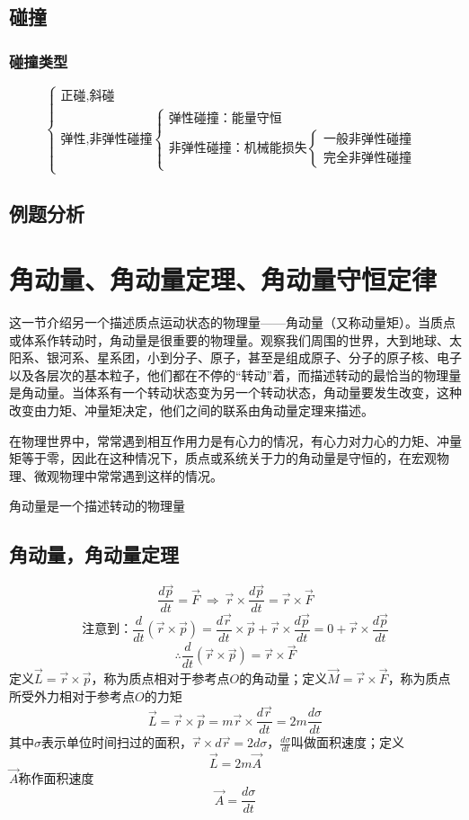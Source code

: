\subsection{碰撞}
\subsubsection{碰撞类型}
\[\begin{cases}\text{正碰,斜碰}\\
\text{弹性,非弹性碰撞}\begin{cases}\text{弹性碰撞：能量守恒}\\\text{非弹性碰撞：机械能损失}\begin{cases}
\text{一般非弹性碰撞}\\
\text{完全非弹性碰撞}
\end{cases}
\end{cases}
\end{cases}\]
\subsection{例题分析}

\section{角动量、角动量定理、角动量守恒定律}
这一节介绍另一个描述质点运动状态的物理量——角动量（又称动量矩）。当质点或体系作转动时，角动量是很重要的物理量。观察我们周围的世界，大到地球、太阳系、银河系、星系团，小到分子、原子，甚至是组成原子、分子的原子核、电子以及各层次的基本粒子，他们都在不停的“转动”着，而描述转动的最恰当的物理量是角动量。当体系有一个转动状态变为另一个转动状态，角动量要发生改变，这种改变由力矩、冲量矩决定，他们之间的联系由角动量定理来描述。

在物理世界中，常常遇到相互作用力是有心力的情况，有心力对力心的力矩、冲量矩等于零，因此在这种情况下，质点或系统关于力的角动量是守恒的，在宏观物理、微观物理中常常遇到这样的情况。
\begin{center}角动量是一个描述转动的物理量\end{center}
\subsection{角动量，角动量定理}
\[\frac{d\vec{p}}{dt}=\vec{F} \  \Rightarrow \ \vec{r}\times\frac{d\vec{p}}{dt}=\vec{r}\times\vec{F}\]
\[\text{注意到：}\frac{d}{dt}(\vec{r}\times\vec{p})=\frac{d\vec{r}}{dt}\times\vec{p}+\vec{r}\times\frac{d\vec{p}}{dt}=0+\vec{r}\times\frac{d\vec{p}}{dt}\]
\[\therefore \frac{d}{dt}(\vec{r}\times\vec{p}) = \vec{r}\times\vec{F}\]
定义$\vec{L}=\vec{r}\times\vec{p}$，称为质点相对于参考点$O$的角动量；定义$\vec{M}=\vec{r}\times\vec{F}$，称为质点所受外力相对于参考点$O$的力矩
\[\vec{L}=\vec{r}\times\vec{p}=m\vec{r}\times\frac{d\vec{r}}{dt}=2m\frac{d\sigma}{dt}\]
其中$\sigma$表示单位时间扫过的面积，$\vec{r}\times d\vec{r}=2d\sigma$，$\frac{d\sigma}{dt}$叫做面积速度；定义
\[\vec{L}=2m\vec{A}\]
$\vec{A}$称作面积速度
\[\vec{A}=\frac{d\sigma}{dt}\]
